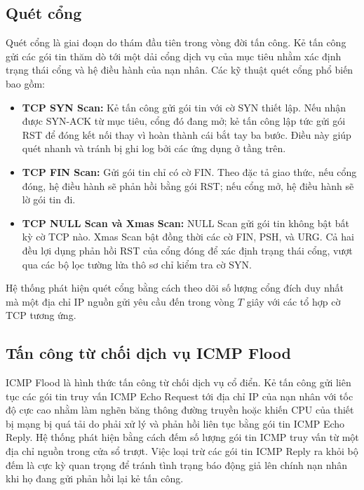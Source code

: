\subsection{Quét cổng}
Quét cổng là giai đoạn do thám đầu tiên trong vòng đời tấn công. Kẻ tấn công gửi các gói tin thăm dò tới một dải cổng dịch vụ của mục tiêu nhằm xác định trạng thái cổng và hệ điều hành của nạn nhân.
Các kỹ thuật quét cổng phổ biến bao gồm:
\begin{itemize}
    \item \textbf{TCP SYN Scan:} Kẻ tấn công gửi gói tin với cờ SYN thiết lập. Nếu nhận được SYN-ACK từ mục tiêu, cổng đó đang mở; kẻ tấn công lập tức gửi gói RST để đóng kết nối thay vì hoàn thành cái bắt tay ba bước. Điều này giúp quét nhanh và tránh bị ghi log bởi các ứng dụng ở tầng trên.
    \item \textbf{TCP FIN Scan:} Gửi gói tin chỉ có cờ FIN. Theo đặc tả giao thức, nếu cổng đóng, hệ điều hành sẽ phản hồi bằng gói RST; nếu cổng mở, hệ điều hành sẽ lờ gói tin đi.
    \item \textbf{TCP NULL Scan và Xmas Scan:} NULL Scan gửi gói tin không bật bất kỳ cờ TCP nào. Xmas Scan bật đồng thời các cờ FIN, PSH, và URG. Cả hai đều lợi dụng phản hồi RST của cổng đóng để xác định trạng thái cổng, vượt qua các bộ lọc tường lửa thô sơ chỉ kiểm tra cờ SYN.
\end{itemize}
Hệ thống phát hiện quét cổng bằng cách theo dõi số lượng cổng đích duy nhất mà một địa chỉ IP nguồn gửi yêu cầu đến trong vòng $T$ giây với các tổ hợp cờ TCP tương ứng.

\subsection{Tấn công từ chối dịch vụ ICMP Flood}
ICMP Flood là hình thức tấn công từ chối dịch vụ cổ điển. Kẻ tấn công gửi liên tục các gói tin truy vấn ICMP Echo Request tới địa chỉ IP của nạn nhân với tốc độ cực cao nhằm làm nghẽn băng thông đường truyền hoặc khiến CPU của thiết bị mạng bị quá tải do phải xử lý và phản hồi liên tục bằng gói tin ICMP Echo Reply.
Hệ thống phát hiện bằng cách đếm số lượng gói tin ICMP truy vấn từ một địa chỉ nguồn trong cửa sổ trượt. Việc loại trừ các gói tin ICMP Reply ra khỏi bộ đếm là cực kỳ quan trọng để tránh tình trạng báo động giả lên chính nạn nhân khi họ đang gửi phản hồi lại kẻ tấn công.

